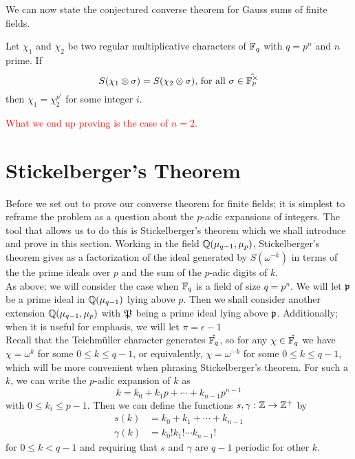 We can now state the conjectured converse theorem for Gauss sums of finite fields.
\begin{conj}[Nien]
Let $\chi_1$ and $\chi_2$ be two regular multiplicative characters of $\mathbb{F}_q$ with $q = p^n$ and $n$ prime. If \[S(\chi_1 \otimes \sigma) = S(\chi_2 \otimes \sigma)\text{, for all } \sigma \in \hat{\mathbb{F}_p^\times}\] then $\chi_1 = \chi_2^{p^i}$ for some integer $i$.
\end{conj}
\noindent \textcolor{red}{What we end up proving is the case of $n = 2$.}


\section{Stickelberger's Theorem}
Before we set out to prove our converse theorem for finite fields; it is simplest to reframe the problem as a question about the $p$-adic expansions of integers.
The tool that allows us to do this is Stickelberger's theorem which we shall introduce and prove in this section.
Working in the field $\mathbb{Q}(\mu_{q-1}, \mu_p)$, Stickelberger's theorem gives as a factorization of the ideal generated by $S(\omega^{-k})$ in terms of the the prime ideals over $p$ and the sum of the $p$-adic digits of $k$.
\\

As above; we will consider the case when $\mathbb{F}_q$ is a field of size $q = p^n$. 
We will let $\mathfrak{p}$ be a prime ideal in $\mathbb{Q}(\mu_{q-1})$ lying above $p$. 
Then we shall consider another extension $\mathbb{Q}(\mu_{q-1}, \mu_p)$ with $\mathfrak{P}$ being a prime ideal lying above $\mathfrak{p}$. Additionally; when it is useful for emphasis, we will let $\pi = \epsilon - 1$
\\

Recall that the Teichm\"uller character generates $\hat{\mathbb{F}_q}$, so for any $\chi \in \hat{\mathbb{F}_q}$ we have $\chi = \omega^k$ for some $0 \leq k \leq q-1$, or equivalently, $\chi = \omega^{-k}$ for some $0 \leq k \leq q-1$, which will be more convenient when phrasing Stickelberger's theorem.
For such a $k$, we can write the $p$-adic expansion of $k$ as
\[k = k_0 + k_1 p + \cdots + k_{n-1}p^{n-1}\]
with $0 \leq k_i \leq p-1$. Then we can define the functions $s, \gamma : \mathbb{Z} \to \mathbb{Z}^+$ by 
\begin{align*}
s(k) &= k_0 + k_1 + \cdots + k_{n-1} \\
\gamma(k) &= k_0! k_1!  \cdots  k_{n-1}!
\end{align*}
for $0 \leq k < q-1$ and requiring that $s$ and $\gamma$ are $q-1$ periodic for other $k$.
\\

